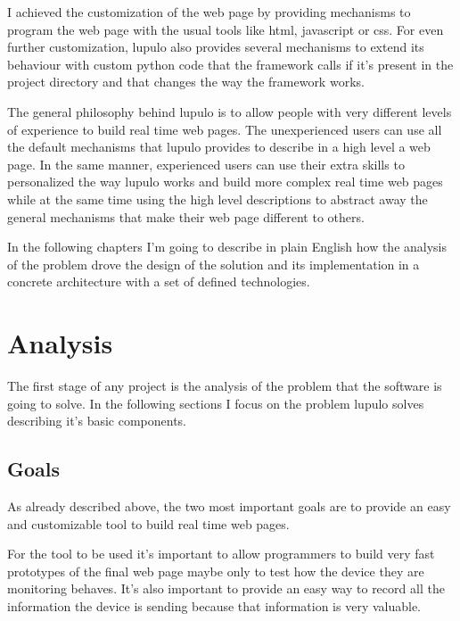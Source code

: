 \documentclass[12pt]{article}
\begin{document}
            I achieved the customization of the web page by providing mechanisms
            to program the web page with the usual tools like html, javascript
            or css. For even further customization, lupulo also provides several
            mechanisms to extend its behaviour with custom python code that the
            framework calls if it's present in the project directory and that
            changes the way the framework works.

            The general philosophy behind lupulo is to allow people with very
            different levels of experience to build real time web pages. The
            unexperienced users can use all the default mechanisms that lupulo
            provides to describe in a high level a web page. In the same manner,
            experienced users can use their extra skills to personalized the way
            lupulo works and build more complex real time web pages while at the
            same time using the high level descriptions to abstract away the
            general mechanisms that make their web page different to others.

            In the following chapters I'm going to describe in plain English
            how the analysis of the problem drove the design of the solution and
            its implementation in a concrete architecture with a set of
            defined technologies.

    \section{Analysis}
        The first stage of any project is the analysis of the problem that the
        software is going to solve. In the following sections I focus on the
        problem lupulo solves describing it's basic components.

        \subsection{Goals}
            As already described above, the two most important goals are to
            provide an easy and customizable tool to build real time web pages.

            For the tool to be used it's important to allow programmers to build
            very fast prototypes of the final web page maybe only to test how
            the device they are monitoring behaves. It's also important to
            provide an easy way to record all the information the device is
            sending because that information is very valuable.
\end{document}
